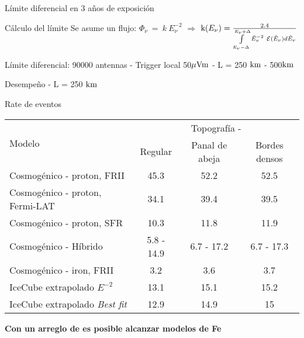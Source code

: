 \begin{frame}{L\'imite diferencial en 3 a\~nos de exposici\'on}

				\begin{alertblock}{\scriptsize C\'alculo del l\'imite}
				\centering
				\scriptsize
				Se asume un flujo: $\Phi_\nu ~ = ~ k ~ E_\nu^{-2}$ $\Rightarrow$ ${\text k (E_\nu)} = \frac{2.4}{\int\limits_{E_\nu-\Delta}^{E_\nu+\Delta} \tilde{E}_{\nu}^{-2}~{\cal E}(\tilde{E}_\nu) d\tilde{E}_\nu}$
			\end{alertblock}
		
		
		\begin{block}{\scriptsize L\'imite diferencial: 90000 antennas - Trigger local 50${\rm \mu Vm}$ - L = 250 ${\rm km}$ - 500${\rm km}$}
			\begin{center}
			\end{center}
		\end{block}
\end{frame}

\begin{frame}{Desempe\~no - L = 250 ${\rm km}$}
	\begin{block}{Rate de eventos}
		\begin{center}
		\renewcommand{\arraystretch}{1.3}
		\footnotesize
		\begin{tabular}{lccc}
			\hline
			\multirow{2}{*}{Modelo} & \multicolumn{3}{c}{Topograf\'ia - \cant{L=250}{km}} \\
			&   Regular &   Panal de abeja &   Bordes densos \\
			\hline
			Cosmogénico - proton, FRII &    45.3 &             52.2 &            52.5 \\
			Cosmogénico - proton, Fermi-LAT &     34.1 &             39.4 &            39.5 \\
			Cosmogénico - proton, SFR &     10.3 &             11.8 &            11.9 \\
			Cosmogénico - H\'ibrido &      5.8 - 14.9 &      6.7 - 17.2 &       6.7 - 17.3 \\
			Cosmogénico - iron, FRII &     3.2 &              3.6 &             3.7 \\
			IceCube extrapolado $E^{-2}$ &      13.1 &             15.1 &            15.2 \\
			IceCube extrapolado \emph{Best fit}  &      12.9 &             14.9 &            15   \\
			\hline
		\end{tabular}
		\end{center}
	\end{block}
	\begin{exampleblock}{}
	\centering
	 \textbf{Con un arreglo de  es posible alcanzar modelos de Fe}

	\end{exampleblock}
\end{frame}

